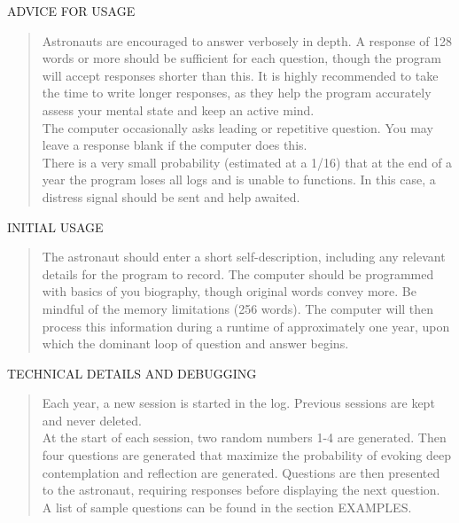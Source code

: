\documentclass{article}
\begin{document}
ADVICE FOR USAGE
\begin{quote}
  Astronauts are encouraged to answer verbosely in depth. A response of 128 words or more should be sufficient for each question, though the program will accept responses shorter than this. It is highly recommended to take the time to write longer responses, as they help the program accurately assess your mental state and keep an active mind. \\

  The computer occasionally asks leading or repetitive question. You may leave a response blank if the computer does this. \\

  There is a very small probability (estimated at a 1/16) that at the end of a year the program loses all logs and is unable to functions. In this case, a distress signal should be sent and help awaited.
\end{quote}

INITIAL USAGE
\begin{quote}
  The astronaut should enter a short self-description, including any relevant details for the program to record. The computer should be programmed with basics of you biography, though original words convey more. Be mindful of the memory limitations (256 words). The computer will then process this information during a runtime of approximately one year, upon which the dominant loop of question and answer begins. 
\end{quote}

TECHNICAL DETAILS AND DEBUGGING
\begin{quote}
  Each year, a new session is started in the log. Previous sessions are kept and never deleted. \\

  At the start of each session, two random numbers 1-4 are generated. Then four questions are generated that maximize the probability of evoking deep contemplation and reflection are generated. Questions are then presented to the astronaut, requiring responses before displaying the next question. \\

  A list of sample questions can be found in the section EXAMPLES.
\end{quote}
\end{document}

